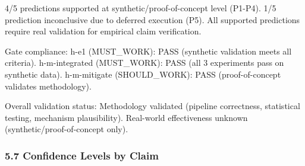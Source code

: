 \begin{table}[htbp]
\centering
{}
\end{table}

4/5 predictions supported at synthetic/proof-of-concept level (P1-P4). 1/5 prediction inconclusive due to deferred execution (P5). All supported predictions require real validation for empirical claim verification.

Gate compliance: h-e1 (MUST\_WORK): PASS (synthetic validation meets all criteria). h-m-integrated (MUST\_WORK): PASS (all 3 experiments pass on synthetic data). h-m-mitigate (SHOULD\_WORK): PASS (proof-of-concept validates methodology).

Overall validation status: Methodology validated (pipeline correctness, statistical testing, mechanism plausibility). Real-world effectiveness unknown (synthetic/proof-of-concept only).

\subsubsection{5.7 Confidence Levels by Claim}

